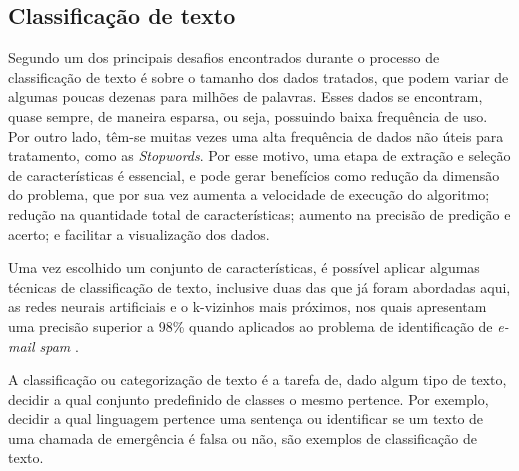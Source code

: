 \subsection{Classificação de texto}
Segundo \cite{aggarwal2014data} um dos principais desafios encontrados durante o processo de classificação de texto é sobre o tamanho dos dados tratados, que podem variar de algumas poucas dezenas para milhões de palavras. Esses dados se encontram, quase sempre, de maneira esparsa, ou seja, possuindo baixa frequência de uso. Por outro lado, têm-se muitas vezes uma alta frequência de dados não úteis para tratamento, como as \textit{Stopwords}. Por esse motivo, uma etapa de extração e seleção de características é essencial, e pode gerar benefícios como redução da dimensão do problema, que por sua vez aumenta a velocidade de execução do algoritmo; redução na quantidade total de características; aumento na precisão de predição e acerto; e facilitar a visualização dos dados.

Uma vez escolhido um conjunto de características, é possível aplicar algumas técnicas de classificação de texto, inclusive duas das que já foram abordadas aqui, as redes neurais artificiais e o k-vizinhos mais próximos, nos quais apresentam uma precisão superior a 98\% quando aplicados ao problema de identificação de \textit{e-mail spam} \citep{russell1994inteligencia}.

A classificação ou categorização de texto é a tarefa de, dado algum tipo de texto, decidir a qual conjunto predefinido de classes o mesmo pertence. Por exemplo, decidir a qual linguagem pertence uma sentença ou identificar se um texto de uma chamada de emergência é falsa ou não, são exemplos de classificação de texto.